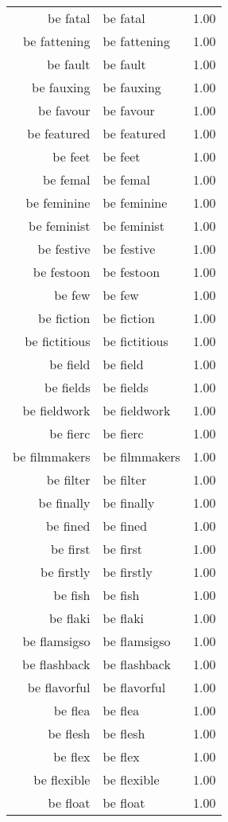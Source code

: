 \begin{table}[ht]
\begin{tabular}{rlr}
  be fatal & be fatal & 1.00 \\ 
  be fattening & be fattening & 1.00 \\ 
  be fault & be fault & 1.00 \\ 
  be fauxing & be fauxing & 1.00 \\ 
  be favour & be favour & 1.00 \\ 
  be featured & be featured & 1.00 \\ 
  be feet & be feet & 1.00 \\ 
  be femal & be femal & 1.00 \\ 
  be feminine & be feminine & 1.00 \\ 
  be feminist & be feminist & 1.00 \\ 
  be festive & be festive & 1.00 \\ 
  be festoon & be festoon & 1.00 \\ 
  be few & be few & 1.00 \\ 
  be fiction & be fiction & 1.00 \\ 
  be fictitious & be fictitious & 1.00 \\ 
  be field & be field & 1.00 \\ 
  be fields & be fields & 1.00 \\ 
  be fieldwork & be fieldwork & 1.00 \\ 
  be fierc & be fierc & 1.00 \\ 
  be filmmakers & be filmmakers & 1.00 \\ 
  be filter & be filter & 1.00 \\ 
  be finally & be finally & 1.00 \\ 
  be fined & be fined & 1.00 \\ 
  be first & be first & 1.00 \\ 
  be firstly & be firstly & 1.00 \\ 
  be fish & be fish & 1.00 \\ 
  be flaki & be flaki & 1.00 \\ 
  be flamsigso & be flamsigso & 1.00 \\ 
  be flashback & be flashback & 1.00 \\ 
  be flavorful & be flavorful & 1.00 \\ 
  be flea & be flea & 1.00 \\ 
  be flesh & be flesh & 1.00 \\ 
  be flex & be flex & 1.00 \\ 
  be flexible & be flexible & 1.00 \\ 
  be float & be float & 1.00 \\ 

\end{tabular}
\end{table}
